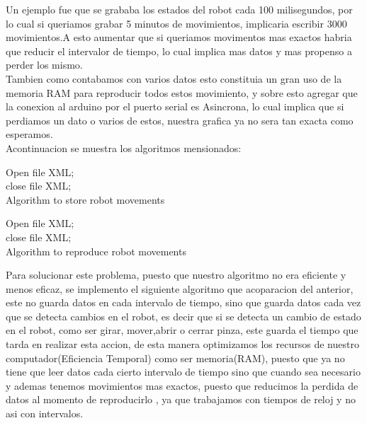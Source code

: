 \documentclass[letterpaper,12pt]{article}
\begin{document}
{Un ejemplo fue que se grababa los estados del robot cada 100 milisegundos, por lo cual si queriamos grabar 5 minutos de movimientos, implicaria escribir 3000 movimientos.A esto aumentar que si queriamos movimentos mas exactos habria que reducir el intervalor de tiempo, lo cual implica mas datos y mas propenso a perder los mismo.\\

Tambien como contabamos con varios datos esto constituia un gran uso de la memoria RAM para reproducir todos estos movimiento, y sobre esto agregar que la conexion al arduino por el puerto serial es Asincrona, lo cual implica que si perdiamos un dato o varios de estos, nuestra grafica ya no sera tan exacta como esperamos.\\

Acontinuacion se muestra los algoritmos mensionados:\\

\begin{algorithm}[H]
	\BlankLine
	Open file XML;\\
	close file XML;\\
	\caption{Algorithm to store robot movements }
\end{algorithm}

\begin{algorithm}[H]
	\BlankLine
	Open file XML;\\
	close file XML;\\
	\caption{Algorithm to reproduce robot movements }
\end{algorithm}

Para solucionar este problema, puesto que nuestro algoritmo no era eficiente y menos eficaz, se implemento el siguiente algoritmo que acoparacion del anterior, este no guarda datos en cada intervalo de tiempo, sino que guarda datos cada vez que se detecta cambios en el robot, es decir que si se detecta un cambio de estado en el robot, como ser girar, mover,abrir o cerrar pinza, este guarda el tiempo que tarda en realizar esta accion, de esta manera optimizamos los recursos de nuestro computador(Eficiencia Temporal) como ser memoria(RAM), puesto que ya no tiene que leer datos cada cierto intervalo de tiempo sino que cuando sea necesario  y ademas tenemos movimientos mas exactos, puesto que reducimos la perdida de datos al momento de reproducirlo , ya que trabajamos con tiempos de reloj y no asi con intervalos.

}
\end{document}

